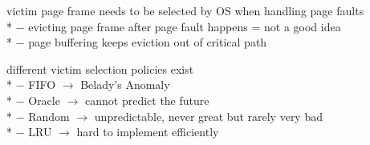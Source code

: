 \begin{summary}
  \begin{items}
    \item victim page frame needs to be selected by OS when handling page faults \\*
      $ - $ evicting page frame after page fault happens = not a good idea \\*
      $ - $ page buffering keeps eviction out of critical path
    \item different victim selection policies exist \\*
      $ - $ FIFO $ \to $ Belady's Anomaly \\*
      $ - $ Oracle $ \to $ cannot predict the future \\*
      $ - $ Random $ \to $ unpredictable, never great but rarely very bad \\*
      $ - $ LRU $ \to $ hard to implement efficiently
  \end{items}
\end{summary}